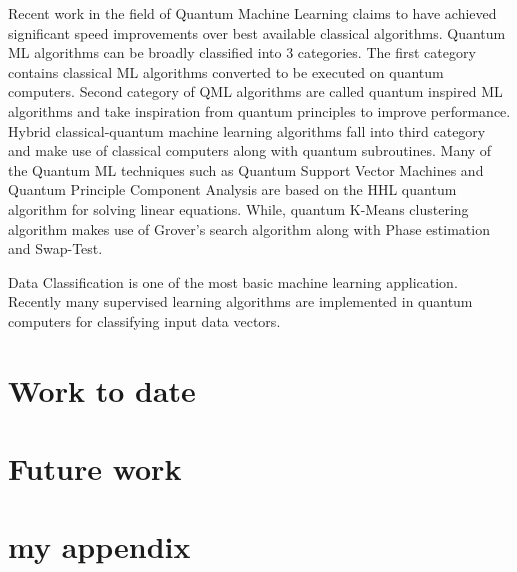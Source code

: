 \documentclass[english,a4paper,11pt,oneside,onecolumn]{book}
\begin{document}
\noindent Recent work in the field of Quantum Machine Learning claims to have achieved significant speed improvements over best available classical algorithms. Quantum ML algorithms can be broadly classified into 3 categories. The first category contains classical ML algorithms converted to be executed on quantum computers. Second category of QML algorithms are called quantum inspired ML algorithms and take inspiration from quantum principles to improve performance. Hybrid classical-quantum machine learning algorithms fall into third category and make use of classical computers along with quantum subroutines. Many of the Quantum ML techniques such as Quantum Support Vector Machines and Quantum Principle Component Analysis are based on the HHL quantum algorithm for solving linear equations. While, quantum K-Means clustering algorithm makes use of Grover's search algorithm along with Phase estimation and Swap-Test.

\noindent Data Classification is one of the most basic machine learning application. Recently many supervised learning algorithms are implemented in quantum computers for classifying input data vectors. 

\chapter{Work to date}
\label{sec:wtd}


\chapter{Future work}
\label{sec:fw}


\nocite{}



\appendix
\chapter{my appendix}
\end{document}
